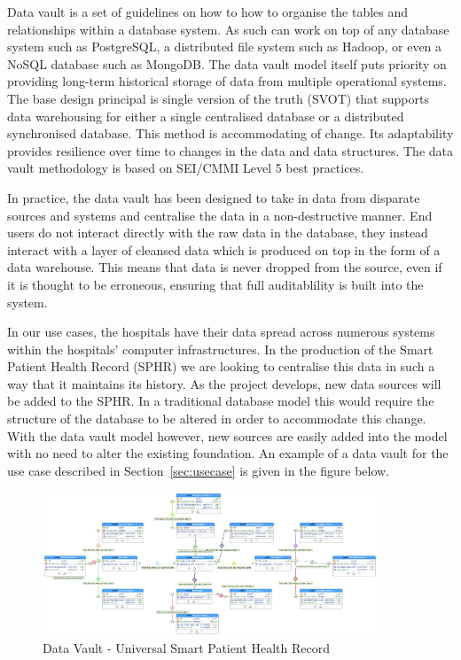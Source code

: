 Data vault is a set of guidelines on how to how to organise the tables and relationships within a database system. As such can work on top of any database system such as PostgreSQL, a distributed file system such as Hadoop, or even a NoSQL database such as MongoDB. The data vault model itself puts priority on providing long-term historical storage of data from multiple operational systems.
%
The base design principal is single version of the truth (SVOT) that supports data warehousing for either a single centralised database or a distributed synchronised database. This method is accommodating of change. Its adaptability provides resilience over time to changes in the data and data structures.
%
The data vault methodology is based on SEI/CMMI Level 5 best practices.

In practice, the data vault has been designed to take in data from disparate sources and systems and centralise the data in a non-destructive manner. End users do not interact directly with the raw data in the database, they instead interact with a layer of cleansed data which is produced on top in the form of a data warehouse. This means that data is never dropped from the source, even if it is thought to be erroneous, ensuring that full auditablility is built into the system.

In our use cases, the hospitals have their data spread across numerous systems within the hospitals' computer infrastructures. In the production of the Smart Patient Health Record (SPHR) we are looking to centralise this data in such a way that it maintains its history.
%
As the project develops, new data sources will be added to the SPHR. In a traditional database model this would require the structure of the database to be altered in order to accommodate this change. With the data vault model however, new sources are easily added into the model with no need to alter the existing foundation. An example of a data vault for the use case described in Section~\ref{sec:usecase} is given in the figure below.

\begin{figure}[H]
    \centering
    \includegraphics[width=10cm]{figures/technical/universal_smart_patient_record.png}
    \caption{Data Vault - Universal Smart Patient Health Record}
    \label{fig:dvlinks}
\end{figure}

